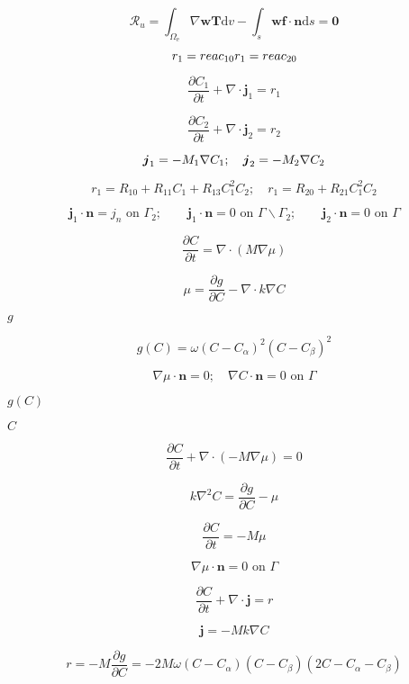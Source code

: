 \documentclass{article}
\begin{document}
\[ \mathscr{R}_u=\int_{\Omega_{\text{e}}}\nabla \boldsymbol{w}\boldsymbol{T} \text{d}v- \int_{s}\boldsymbol{w} \boldsymbol{f} \cdot \boldsymbol{n} \text{d}s = \boldsymbol{0} \]
\pagebreak

\[ r_1= reac_{10} \\ r_1= reac_{20} \]
\pagebreak

\[ \frac{\partial C_\text{1}}{\partial t}+\nabla\cdot\boldsymbol{j}_1=r_1 \]
\pagebreak

\[ \frac{\partial C_\text{2}}{\partial t}+\nabla\cdot\boldsymbol{j}_2=r_2 \]
\pagebreak

\[ \boldsymbol{j}_1=-M_1\nabla C_\text{1}; \quad \boldsymbol{j}_2=-M_2\nabla C_\text{2}\\ \]
\pagebreak

\[ r_1= R_{10}+R_{11}C_1+R_{13}C_1^2C_2; \quad r_1= R_{20}+R_{21}C_1^2C_2 \]
\pagebreak

\[ \boldsymbol{j}_1\cdot\boldsymbol{n}=j_n \text{ on }\Gamma_2;\quad \quad \boldsymbol{j}_1\cdot\boldsymbol{n}=0 \text{ on }\Gamma \backslash \Gamma_2; \quad \quad \boldsymbol{j}_2\cdot\boldsymbol{n}=0 \text{ on }\Gamma \]
\pagebreak

\[ \frac{\partial C}{\partial t}=\nabla\cdot(M\nabla\mu) \]
\pagebreak

\[ \mu=\frac{\partial g}{\partial C}-\nabla\cdot k\nabla C \]
\pagebreak

$g$
\pagebreak

\[ g(C)=\omega(C-C_\alpha)^2(C-C_\beta)^2 \]
\pagebreak

\[ \nabla\mu\cdot\boldsymbol{n}=0;\quad \nabla C\cdot\boldsymbol{n}=0 \text{ on }\Gamma \]
\pagebreak

$g(C)$
\pagebreak

$C$
\pagebreak

\[ \frac{\partial C}{\partial t}+\nabla\cdot(-M\nabla\mu)=0 \]
\pagebreak

\[ k\nabla^2 C=\frac{\partial g}{\partial C}-\mu \]
\pagebreak

\[ \frac{\partial C}{\partial t}=-M\mu \]
\pagebreak

\[ \nabla \mu\cdot\boldsymbol{n}=0 \text{ on }\Gamma \]
\pagebreak

\[ \frac{\partial C}{\partial t}+\nabla\cdot\boldsymbol{j}=r \]
\pagebreak

\[ \boldsymbol{j}=-Mk\nabla C \]
\pagebreak

\[ r=-M\frac{\partial g}{\partial C}=-2M\omega(C-C_\alpha)(C-C_\beta)(2C-C_\alpha-C_\beta) \]
\pagebreak
\end{document}
